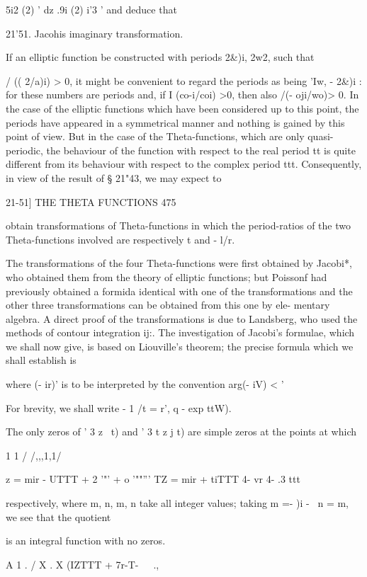 5i2 (2) ' dz .9i (2) i'3 ' and deduce that

21'51. Jacohis imaginary transformation.

If an elliptic function be constructed with periods 2\&)i, 2w2, such
that

/ (( 2/a)i) > 0, it might be convenient to regard the periods as being
'Iw, - 2\&)i : for these numbers are periods and, if I (co-i/coi) >0,
then also /(- oji/wo)> 0. In the case of the elliptic functions which
have been considered up to this point, the periods have appeared in a
symmetrical manner and nothing is gained by this point of view. But in
the case of the Theta-functions, which are only quasi-periodic, the
behaviour of the function with respect to the real period tt is quite
different from its behaviour with respect to the complex period ttt.
Consequently, in view of the result of § 21"43, we may expect to

21-51] THE THETA FUNCTIONS 475

obtain transformations of Theta-functions in which the period-ratios
of the two Theta-functions involved are respectively t and - l/r.

The transformations of the four Theta-functions were first obtained by
Jacobi*, who obtained them from the theory of elliptic functions; but
Poissonf had previously obtained a formida identical with one of the
transformations and the other three transformations can be obtained
from this one by ele- mentary algebra. A direct proof of the
transformations is due to Landsberg, who used the methods of contour
integration ij:. The investigation of Jacobi's formulae, which we
shall now give, is based on Liouville's theorem; the precise formula
which we shall establish is

where (- ir)' is to be interpreted by the convention arg(- iV) < '

For brevity, we shall write - 1 /t = r', q - exp ttW).

The only zeros of ' 3 z \ t) and ' 3 t z j t) are simple zeros at the
points at which

1 1 / /,,,1,1/

z = mir - UTTT + 2 '"' + o '""''' TZ = mir + tiTTT 4- vr 4- .3 ttt

respectively, where m, n, m, n take all integer values; taking m =- )i
- \, n = m, we see that the quotient

is an integral function with no zeros.

A 1 . / X . X (IZTTT + 7r-T-\ \ \ .,

